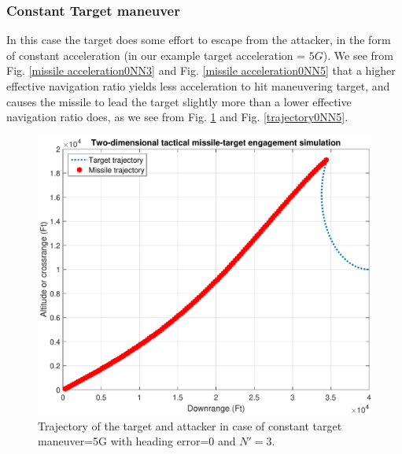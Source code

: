 
\subsubsection{Constant Target maneuver}
In this case the target does some effort to escape from the attacker, in the form of constant acceleration (in our example target acceleration = $5G$).
We see from Fig. \ref{missile acceleration0NN3} and Fig. \ref{missile acceleration0NN5} that a higher effective navigation ratio yields less acceleration to hit maneuvering target, and causes the missile to lead the target slightly more than a lower effective navigation ratio does, as we see from Fig. \ref{trajectory0NN3} and Fig. \ref{trajectory0NN5}.



\begin{figure}[htb]
	\centering
	\includegraphics[scale = 0.75]{fig/trajectoryXNT5HE0N3.pdf}
	\caption{Trajectory of the target and attacker in case of constant target maneuver=5G with heading error=0 and $N'=3$.}
	\label{trajectory0NN3}
\end{figure}


